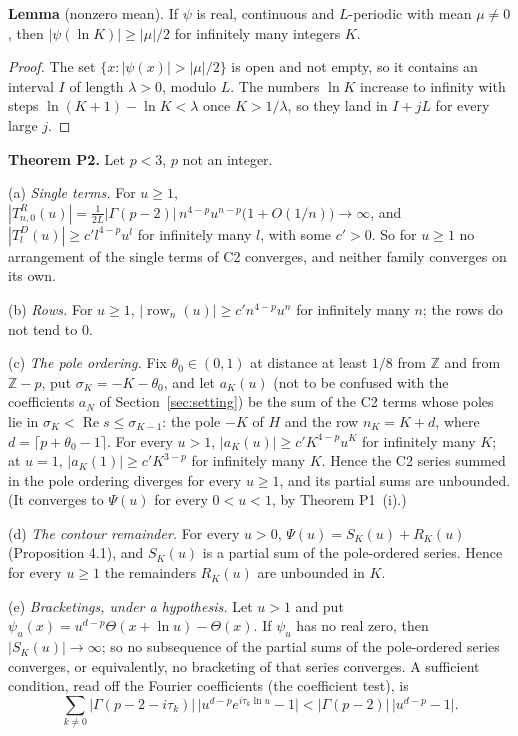 \documentclass[11pt]{article}
\newcommand{\re}{\operatorname{Re}}
\newcommand{\row}{\operatorname{row}}
\begin{document}
\noindent\textbf{Lemma} (nonzero mean). If $\psi$ is real, continuous and $L$-periodic with mean $\mu\ne0$, then $|\psi(\ln K)|\ge|\mu|/2$ for infinitely many integers $K$.

\begin{proof}
The set $\{x:|\psi(x)|>|\mu|/2\}$ is open and not empty, so it contains an interval $I$ of length $\lambda>0$, modulo $L$. The numbers $\ln K$ increase to infinity with steps $\ln(K+1)-\ln K<\lambda$ once $K>1/\lambda$, so they land in $I+jL$ for every large $j$.
\end{proof}

\noindent\textbf{Theorem P2.} Let $p<3$, $p$ not an integer.

(a) \emph{Single terms.} For $u\ge1$, $|T^R_{n,0}(u)|=\frac{1}{2L}|\Gamma(p-2)|\,n^{4-p}u^{n-p}\bigl(1+O(1/n)\bigr)\to\infty$, and $|T^D_l(u)|\ge c'l^{4-p}u^l$ for infinitely many $l$, with some $c'>0$. So for $u\ge1$ no arrangement of the single terms of C2 converges, and neither family converges on its own.

(b) \emph{Rows.} For $u\ge1$, $|\row_n(u)|\ge c'n^{4-p}u^n$ for infinitely many $n$; the rows do not tend to $0$.

(c) \emph{The pole ordering.} Fix $\theta_0\in(0,1)$ at distance at least $1/8$ from $\mathbb{Z}$ and from $\mathbb{Z}-p$, put $\sigma_K=-K-\theta_0$, and let $a_K(u)$ (not to be confused with the coefficients $a_N$ of Section~\ref{sec:setting}) be the sum of the C2 terms whose poles lie in $\sigma_K<\re s\le\sigma_{K-1}$: the pole $-K$ of $H$ and the row $n_K=K+d$, where $d=\lceil p+\theta_0-1\rceil$. For every $u>1$, $|a_K(u)|\ge c'K^{4-p}u^K$ for infinitely many $K$; at $u=1$, $|a_K(1)|\ge c'K^{3-p}$ for infinitely many $K$. Hence the C2 series summed in the pole ordering diverges for every $u\ge1$, and its partial sums are unbounded. (It converges to $\Psi(u)$ for every $0<u<1$, by Theorem P1~(i).)

(d) \emph{The contour remainder.} For every $u>0$, $\Psi(u)=S_K(u)+R_K(u)$ (Proposition 4.1), and $S_K(u)$ is a partial sum of the pole-ordered series. Hence for every $u\ge1$ the remainders $R_K(u)$ are unbounded in $K$.

(e) \emph{Bracketings, under a hypothesis.} Let $u>1$ and put $\psi_u(x)=u^{d-p}\Theta(x+\ln u)-\Theta(x)$. If $\psi_u$ has no real zero, then $|S_K(u)|\to\infty$; so no subsequence of the partial sums of the pole-ordered series converges, or equivalently, no bracketing of that series converges. A sufficient condition, read off the Fourier coefficients (the coefficient test), is
\[
\sum_{k\ne0}|\Gamma(p-2-i\tau_k)|\,\bigl|u^{d-p}e^{i\tau_k\ln u}-1\bigr|<|\Gamma(p-2)|\,\bigl|u^{d-p}-1\bigr|.
\]
\end{document}
